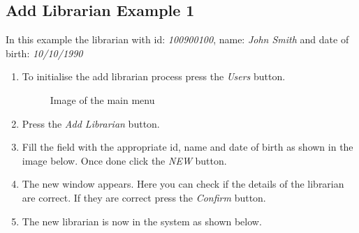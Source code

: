 \documentclass[graybox,envcountchap,sectrefs]{./../lu.uni.lassy.excalibur.standard.report.libraries/styles/svmono}
\begin{document}
\subsection{Add Librarian Example 1}
In this example the librarian with id: \emph{100900100}, name: \emph{John Smith}
and date of birth: \emph{10/10/1990}
\begin{enumerate}
\item To initialise the add librarian process press the \emph{Users} button.
\begin{figure}
 \centering
 
 \caption{Image of the main menu}
 \label{figure:main_menu}
\end{figure}
\item Press the \emph{Add Librarian} button.
\item Fill the field with the appropriate id, name and date of birth as shown in the image below. Once done click the \emph{NEW} button.
\item The new window appears. Here you can check if the details of the librarian are correct. If they are correct press the \emph{Confirm} button.
\item The new librarian is now in the system as shown below.
\end{enumerate}




\newpage
  

\newpage

\appendix

\newpage
 
    
\printglossaries
\newpage


\cleardoublepage 
 

\label{sec:references}

 
\end{document}
